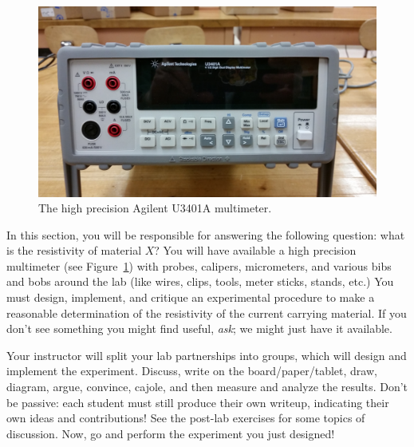 \documentclass[12pt]{article}
\begin{document}
\begin{figure}
  \centering
  \includegraphics[width=2\textwidth/3]{figures/agilent_u3401a}
  \caption{The high precision Agilent U3401A multimeter.}
  \label{fig:multimeter}
\end{figure}
In this section, you will be responsible for answering the following
question: what is the resistivity of material $X$?  You will have
available a high precision multimeter (see
Figure~\ref{fig:multimeter}) with probes, calipers, micrometers, and
various bibs and bobs around the lab (like wires, clips, tools, meter
sticks, stands, etc.)  You must design, implement, and critique an
experimental procedure to make a reasonable determination of the
resistivity of the current carrying material.  If you don't see
something you might find useful, \textit{ask}; we might just have it
available.

Your instructor will split your lab partnerships into groups, which
will design and implement the experiment.  Discuss, write on the
board/paper/tablet, draw, diagram, argue, convince, cajole, and then
measure and analyze the results.  Don't be passive: each student must
still produce their own writeup, indicating their own ideas and
contributions!  See the post-lab exercises for some topics of
discussion.  Now, go and perform the experiment you just designed!
\end{document}
